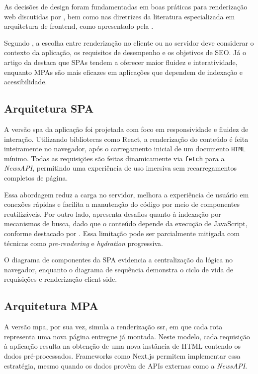As decisões de design foram fundamentadas em boas práticas para renderização web discutidas por \cite{osmani2025}, bem como nas diretrizes da literatura especializada em arquitetura de frontend, como apresentado pela \cite{atori2024}.

Segundo \cite{osmani2025}, a escolha entre renderização no cliente ou no servidor deve considerar o contexto da aplicação, os requisitos de desempenho e os objetivos de SEO. Já o artigo da \cite{atori2024} destaca que SPAs tendem a oferecer maior fluidez e interatividade, enquanto MPAs são mais eficazes em aplicações que dependem de indexação e acessibilidade.

\subsection{Arquitetura SPA}

A versão \acrshort{spa} da aplicação foi projetada com foco em responsividade e fluidez de interação. Utilizando bibliotecas como React, a renderização do conteúdo é feita inteiramente no navegador, após o carregamento inicial de um documento \texttt{HTML} mínimo. Todas as requisições são feitas dinamicamente via \texttt{fetch} para a \textit{NewsAPI}, permitindo uma experiência de uso imersiva sem recarregamentos completos de página.

Essa abordagem reduz a carga no servidor, melhora a experiência de usuário em conexões rápidas e facilita a manutenção do código por meio de componentes reutilizáveis. Por outro lado, apresenta desafios quanto à indexação por mecanismos de busca, dado que o conteúdo depende da execução de JavaScript, conforme destacado por \cite{osmani2025}. Essa limitação pode ser parcialmente mitigada com técnicas como \textit{pre-rendering} e \textit{hydration} progressiva.

O diagrama de componentes da SPA evidencia a centralização da lógica no navegador, enquanto o diagrama de sequência demonstra o ciclo de vida de requisições e renderização client-side.

\subsection{Arquitetura MPA}

A versão \acrshort{mpa}, por sua vez, simula a renderização \acrshort{ssr}, em que cada rota representa uma nova página entregue já montada. Neste modelo, cada requisição à aplicação resulta na obtenção de uma nova instância de HTML contendo os dados pré-processados. Frameworks como Next.js permitem implementar essa estratégia, mesmo quando os dados provêm de APIs externas como a \textit{NewsAPI}.

